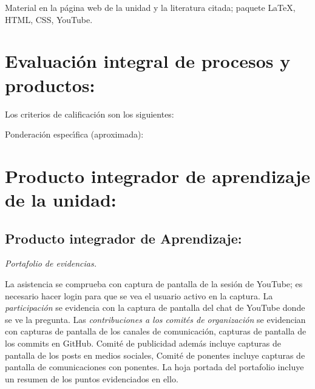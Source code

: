 Material en la p\'{a}gina web de la unidad y la literatura citada;
paquete {\LaTeX}, HTML, CSS, YouTube.



\section{Evaluaci\'{o}n integral de procesos y productos:}

Los criterios de calificaci\'{o}n son los siguientes:

  
Ponderaci\'{o}n espec\'{\i}fica (aproximada):



\newpage

\section{Producto integrador de aprendizaje de la unidad:}

\subsection{Producto integrador de Aprendizaje:}

{\em Portafolio de evidencias.}

La asistencia se comprueba con captura de pantalla de la sesi\'{o}n de
YouTube; es necesario hacer login para que se vea el usuario activo en
la captura. La {\em participaci\'{o}n} se evidencia con la captura de
pantalla del chat de YouTube donde se ve la pregunta. Las {\em
  contribuciones a los comit\'{e}s de organizaci\'{o}n} se evidencian con
capturas de pantalla de los canales de comunicaci\'{o}n, capturas de
pantalla de los commits en GitHub. Comit\'{e} de publicidad adem\'{a}s
incluye capturas de pantalla de los posts en medios sociales,
Comit\'{e} de ponentes incluye capturas de pantalla de comunicaciones
con ponentes. La hoja portada del portafolio incluye un resumen de los
puntos evidenciados en ello.
